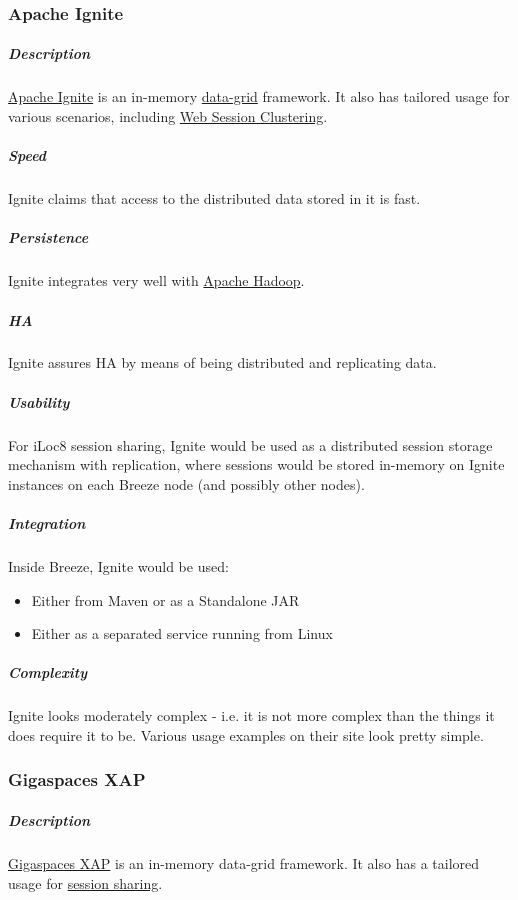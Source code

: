 \documentclass{article}
\begin{document}
	\subsubsection{Apache Ignite}
	
	\subparagraph*{Description}
	
	\href{https://ignite.apache.org}{Apache Ignite} is an in-memory \href{https://en.wikipedia.org/wiki/Data_grid}{data-grid} framework. It also has tailored usage for various scenarios, including \href{https://ignite.apache.org/use-cases/caching/web-session-clustering.html}{Web Session Clustering}.
	
	\subparagraph*{Speed}
	
	Ignite claims that access to the distributed data stored in it is fast.
	
	\subparagraph*{Persistence}
	
	Ignite integrates very well with \href{https://ignite.apache.org/features/igfs.html}{Apache Hadoop}.
	
	\subparagraph*{HA}
	
	Ignite assures HA by means of being distributed and replicating data.
	
	\subparagraph*{Usability}
	
	For iLoc8 session sharing, Ignite would be used as a distributed session storage mechanism with replication, where sessions would be stored in-memory on Ignite instances on each Breeze node (and possibly other nodes).
	
	\subparagraph*{Integration}
	
	Inside Breeze, Ignite would be used:
	\begin{itemize}
		\item Either from Maven or as a Standalone JAR
		\item Either as a separated service running from Linux
	\end{itemize}
	
	\subparagraph*{Complexity}
	
	Ignite looks moderately complex - i.e. it is not more complex than the things it does require it to be. Various usage examples on their site look pretty simple.
	
	\subsubsection{Gigaspaces XAP}
	
	\subparagraph*{Description}
	
	\href{http://www.gigaspaces.com/xap-in-memory-caching-scaling/datagrid}{Gigaspaces XAP} is an in-memory data-grid framework. It also has a tailored usage for \href{http://docs.gigaspaces.com/xap110/global-http-session-sharing-overview.html}{session sharing}.
	
\end{document}
